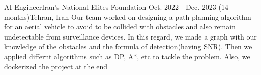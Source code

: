 \resumeSubheadingReza
{AI Engineer}{Iran's National Elites Foundation}
{Oct. 2022 - Dec. 2023 (14 months)}{Tehran, Iran}
{Our team worked on designing a path planning algorithm for an aerial vehicle to avoid to be collided with obstacles and also remain undetectable from surveillance devices.
In this regard, we made a graph with our knowledge of the obstacles and the formula of detection(having SNR). Then we applied differnt algorithms such as DP, A*, etc to tackle the problem.
Also, we dockerized the project at the end}